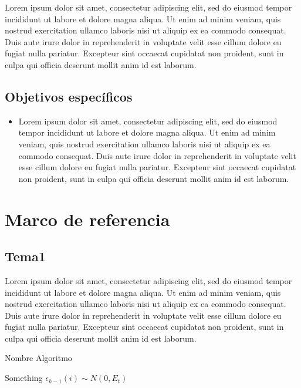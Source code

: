 \documentclass[11pt]{report} %
\begin{document}
Lorem ipsum dolor sit amet, consectetur adipiscing elit, sed do eiusmod tempor incididunt ut labore et dolore magna aliqua. Ut enim ad minim veniam, quis nostrud exercitation ullamco laboris nisi ut aliquip ex ea commodo consequat. Duis aute irure dolor in reprehenderit in voluptate velit esse cillum dolore eu fugiat nulla pariatur. Excepteur sint occaecat cupidatat non proident, sunt in culpa qui officia deserunt mollit anim id est laborum.

\subsection{Objetivos específicos}

\begin{itemize}
	
\item Lorem ipsum dolor sit amet, consectetur adipiscing elit, sed do eiusmod tempor incididunt ut labore et dolore magna aliqua. Ut enim ad minim veniam, quis nostrud exercitation ullamco laboris nisi ut aliquip ex ea commodo consequat. Duis aute irure dolor in reprehenderit in voluptate velit esse cillum dolore eu fugiat nulla pariatur. Excepteur sint occaecat cupidatat non proident, sunt in culpa qui officia deserunt mollit anim id est laborum.

\end{itemize}

\section{Marco de referencia} %

\subsection{Tema1}

Lorem ipsum dolor sit amet, consectetur adipiscing elit, sed do eiusmod tempor incididunt ut labore et dolore magna aliqua. Ut enim ad minim veniam, quis nostrud exercitation ullamco laboris nisi ut aliquip ex ea commodo consequat. Duis aute irure dolor in reprehenderit in voluptate velit esse cillum dolore eu fugiat nulla pariatur. Excepteur sint occaecat cupidatat non proident, sunt in culpa qui officia deserunt mollit anim id est laborum.

\begin{algorithm}
    \caption{Nombre Algoritmo}\label{code: Filtro de partículas}
    \begin{algorithmic}[1]
        \State Something ${\epsilon}_{k-1}(i) \sim N(0,{E}_{t})$ 
        \EndFor
        \EndFunction
    \end{algorithmic}
\end{algorithm}
\end{document}
